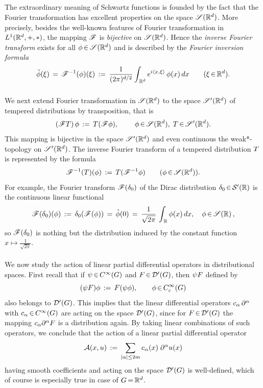 \documentclass[11pt,twoside]{article}
\def\G{G}
\begin{document}
\subparagraph{}
The extraordinary meaning of Schwartz functions is founded by the fact that
the Fourier transformation has excellent properties on the space $\mathscr{S}({\mathbb{R}}^d)$.
More precisely,
besides the well-known features of Fourier transformation in $L^1({\mathbb{R}}^d,+,\ast)$,
the mapping $\mathscr{F}$ is \textit{bijective} on $\mathscr{S}({\mathbb{R}}^d)$.
Hence the \textit{inverse Fourier transform} exists for all $\phi {\,\in\,} \mathscr{S}({\mathbb{R}}^d)$
and is described by the \textit{Fourier inversion formula}
\[
\check{\phi}(\xi) \,=\, 
\mathscr{F}^{-1}(\phi)(\xi) \,:=\,
\frac{1}{(2\pi)^{d/2}}
\int_{\,{\mathbb{R}}^d} e^{i \langle x,\xi \rangle} \, \phi(x) \, dx
\quad \quad (\xi {\,\in\,} {\mathbb{R}}^d).
\]

\subparagraph{}
We next extend Fourier transformation in $\mathscr{S}({\mathbb{R}}^d)$ to the space $\mathscr{S}'({\mathbb{R}}^d)$
of tempered distributions by transposition,
that is
\[
(\mathscr{F} T) \, \phi \, := \, T(\mathscr{F} \phi),
\quad \quad \; \phi {\,\in\,} \mathscr{S}({\mathbb{R}}^d), \; T {\,\in\,} \mathscr{S}'({\mathbb{R}}^d).
\]
This mapping is bijective in the space $\mathscr{S}'({\mathbb{R}}^d)$
and even continuous {\wrt} the weak*-topology on $\mathscr{S}'({\mathbb{R}}^d)$.
The inverse Fourier transform of a tempered distribution $T$
is represented by the formula
\[
\mathscr{F}^{-1}(T)(\phi) \, := \, T(\mathscr{F}^{-1} \phi)
\quad \quad (\phi {\,\in\,} \mathscr{S}({\mathbb{R}}^d)).
\]
For example,
the Fourier transform $\mathscr{F}(\delta_0)$ of the Dirac distribution
$\delta_0 {\,\in\,} {\mathcal{S}}'({\mathbb{R}})$ is the continuous linear functional
\[
\FT(\delta_0)(\phi) \, := \,
\delta_0(\FT(\phi)) \= \hat{\phi}(0) \=
\frac{1}{\sqrt{2\pi}} \, \int_{\,\R} \phi(x) \, dx,
\quad \phi \xeof \SR1\,,
\]
so $\mathscr{F}(\delta_0)$ is nothing but the distribution induced by
the constant function $x \mapsto \frac{1}{\sqrt{2\pi}}$.

\paragraph{} %
We now study the action of linear partial differential operators 
in distributional spaces.
First recall
that if $\psi \xeof \SF$ and $\disF \xeof \D'(\G)$,
then $\psi F$ defined by
\[
(\psi \disF) \phi \, := \, \disF (\psi \phi), \quad \quad \phi \xeof \TF
\]
also belongs to $\D'(\G)$. 
This implies that the linear differential operators $c_{\alpha} \, \partial^{\alpha}$ 
with $c_{\alpha} \xeof \SF$ are acting on the space $\D'(\G)$,
since for $\disF \xeof \D'(\G)$
the mapping $c_{\alpha} \partial^{\alpha} F$ is a distribution again.
By taking linear combinations of such operators,
we conclude that the action
of a linear partial differential operator
\[
\DO(x,u) \, := \,
\sum_{\abs{\alpha} \leq 2m} c_{\alpha}(x) \; \PA u(x)
\]
having smooth coefficients and acting on the space $\D'(\G)$ is well-defined,
which of course is especially true in case of $\G \eq \Rd$.
\end{document}
